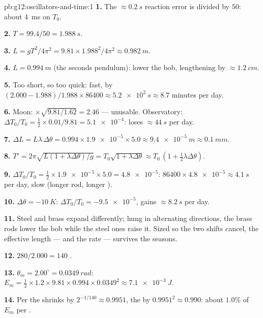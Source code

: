 \begin{solution}{pb:g12:oscillators-and-time:1}
\textbf{1.} The $\approx \qty{0.2}{s}$ reaction error is divided by
$50$: about \qty{4}{ms} on $T_0$.

\textbf{2.} $T = 99.4/50 = \qty{1.988}{s}$.

\textbf{3.} $L = gT^2/4\pi^2 = 9.81 \times 1.988^2/4\pi^2 \approx
\qty{0.982}{m}$.

\textbf{4.} $L = \qty{0.994}{m}$ (the seconds pendulum): lower the
bob, lengthening by $\approx \qty{1.2}{cm}$.

\textbf{5.} Too short, so too quick: fast, by $(2.000 -
1.988)/1.988 \times 86400 \approx \qty{5.2e2}{s} \approx 8.7$
minutes per day.

\textbf{6.} Moon: $\times\sqrt{9.81/1.62} = 2.46$ --- unusable.
Observatory: $\Delta T_0/T_0 = \tfrac12 \times 0.01/9.81 =
\num{5.1e-4}$: loses $\approx \qty{44}{s}$ per day.

\textbf{7.} $\Delta L = L\lambda\,\Delta\theta = 0.994 \times
\num{1.9e-5} \times 5.0 \approx \qty{9.4e-5}{m} \approx
\qty{0.1}{mm}$.

\textbf{8.} $T' = 2\pi\sqrt{L(1 + \lambda\Delta\theta)/g} =
T_0\sqrt{1 + \lambda\Delta\theta} \approx T_0\,(1 + \tfrac12
\lambda\Delta\theta)$.

\textbf{9.} $\Delta T_0/T_0 = \tfrac12 \times \num{1.9e-5} \times
5.0 = \num{4.8e-5}$: $86400 \times \num{4.8e-5} \approx
\qty{4.1}{s}$ per day, slow (longer rod, longer ).

\textbf{10.} $\Delta\theta = \qty{-10}{K}$: $\Delta T_0/T_0 =
\num{-9.5e-5}$, gains $\approx \qty{8.2}{s}$ per day.

\textbf{11.} Steel and brass expand differently; hung in alternating
directions, the brass rods lower the bob while the steel ones raise
it. Sized so the two shifts cancel, the effective length --- and the
rate --- survives the seasons.

\textbf{12.} $280/2.000 = 140$ .

\textbf{13.} $\theta_m = 2.00^\circ = \qty{0.0349}{rad}$: $E_m =
\tfrac12 \times 1.2 \times 9.81 \times 0.994 \times 0.0349^2 \approx
\qty{7.1e-3}{J}$.

\textbf{14.} Per  the  shrinks by $2^{-1/140} \approx
0.9951$, the  by $0.9951^2 \approx 0.990$: about $1.0\%$ of
$E_m$ per .


\end{solution}
